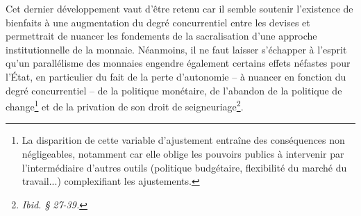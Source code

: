 {Cet dernier développement vaut d'être retenu car il semble soutenir l'existence de bienfaits à une augmentation du degré concurrentiel entre les devises et permettrait de nuancer les fondements de la sacralisation d'une approche institutionnelle de la monnaie. Néanmoins, il ne faut laisser s'échapper à l'esprit qu'un parallélisme des monnaies engendre également certains effets néfastes pour l'État, en particulier du fait de la perte d'autonomie \---{} à nuancer en fonction du degré concurrentiel \---{} de la politique monétaire, de l'abandon de la politique de change\footnote{La disparition de cette variable d'ajustement entraîne des conséquences non négligeables, notamment car elle oblige les pouvoirs publics à intervenir par l'intermédiaire d'autres outils (politique budgétaire, flexibilité du marché du travail...) complexifiant les ajustements.} et de la privation de son droit de seigneuriage\footnote{\emph{Ibid. \S{} 27-39.}}.\par

}
